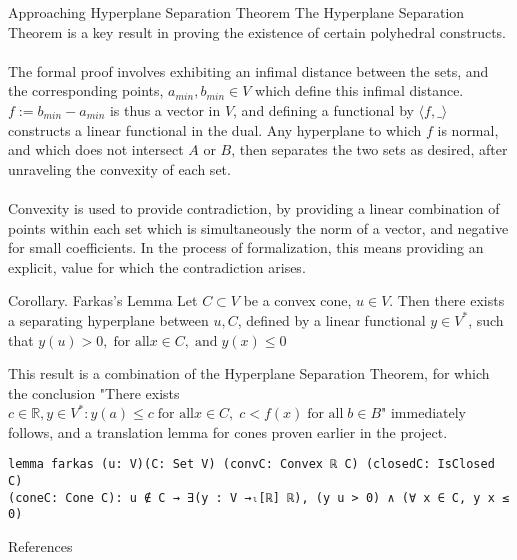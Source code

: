 \documentclass[final]{beamer}
\newlength{\colwidth}
\begin{document}
\begin{frame}[fragile]
\begin{columns}[t]
\begin{column}{\colwidth}
            \begin{block}{Approaching Hyperplane Separation Theorem}
                The Hyperplane Separation Theorem is a key result in proving the existence of certain polyhedral constructs.
                \\\\The formal proof involves exhibiting an infimal distance between the sets, and the corresponding points, $a_{min}, b_{min} \in V$ which define this infimal distance.
                $f:= b_{min}-a_{min}$ is thus a vector in $V$, and defining a functional by $\langle f, \_\rangle$ constructs a linear functional in the dual. Any hyperplane to which $f$
                is normal, and which does not intersect $A$ or $B$, then separates the two sets as desired, after unraveling the convexity of each set.
                \\\\Convexity is used to provide contradiction, by providing a linear combination of points within each set which is simultaneously the norm of a vector,
                and negative for small coefficients. In the process of formalization, this means providing an explicit, value for which the contradiction arises.         
            \end{block}
            
             
            \begin{exampleblock}{Corollary. Farkas's Lemma}
              Let $C \subset V$ be a convex cone, $u\in V$. Then there exists a separating hyperplane between $u, C$, defined by a linear functional $y \in V^*$, such that $
              y(u)> 0, \; \text{for all} x\in C, \; \text{and} \; y(x) \le 0
              $
            \end{exampleblock}
            \vspace{-1em}
            This result is  a combination of the Hyperplane Separation Theorem, for which the conclusion "There exists$
              c\in \mathbb{R}, y \in V^*: y(a) \le c\; \text{for all} x\in C, \; c < f(x)\; \text{for all} \; b\in B
            $" immediately follows, and a translation lemma for cones proven earlier in the project.
\begin{Verbatim}
lemma farkas (u: V)(C: Set V) (convC: Convex ℝ C) (closedC: IsClosed C)
(coneC: Cone C): u ∉ C → ∃(y : V →ₗ[ℝ] ℝ), (y u > 0) ∧ (∀ x ∈ C, y x ≤ 0)
\end{Verbatim}  
           
            
        \begin{block}{References}
        \nocite{liunotes}
        \begin{bibdiv}
        \begin{biblist}
        \end{biblist}
        \end{bibdiv}
        \end{block}
\end{column}


\end{columns}
\end{frame}
\end{document}
